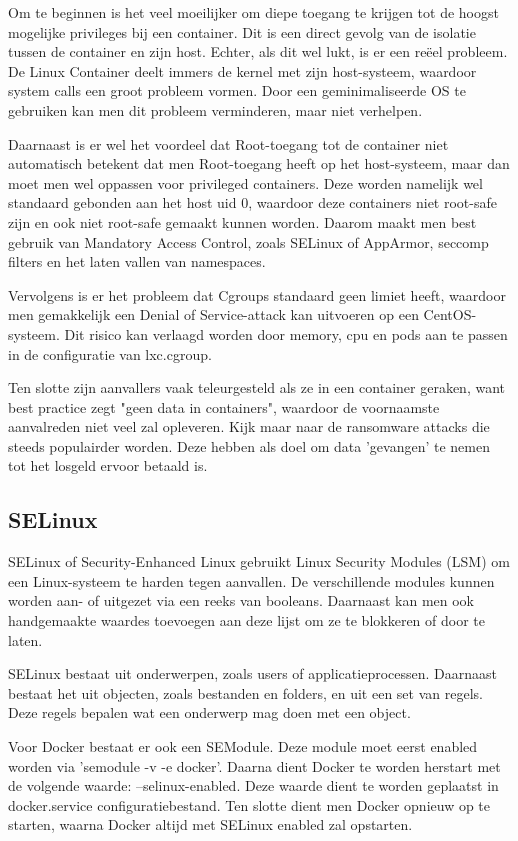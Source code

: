 Om te beginnen is het veel moeilijker om diepe toegang te krijgen tot de hoogst mogelijke privileges bij een container. Dit is een direct gevolg van de isolatie tussen de container en zijn host. Echter, als dit wel lukt, is er een reëel probleem. De Linux Container deelt immers de kernel met zijn host-systeem, waardoor system calls een groot probleem vormen. Door een geminimaliseerde OS te gebruiken kan men dit probleem verminderen, maar niet verhelpen.

Daarnaast is er wel het voordeel dat Root-toegang tot de container niet automatisch betekent dat men Root-toegang heeft op het host-systeem, maar dan moet men wel oppassen voor privileged containers. Deze worden namelijk wel standaard gebonden aan het host uid 0, waardoor deze containers niet root-safe zijn en ook niet root-safe gemaakt kunnen worden. Daarom maakt men best gebruik van Mandatory Access Control, zoals SELinux of AppArmor, seccomp filters en het laten vallen van namespaces.

Vervolgens is er het probleem dat Cgroups standaard geen limiet heeft, waardoor men gemakkelijk een Denial of Service-attack kan uitvoeren op een CentOS-systeem. Dit risico kan verlaagd worden door memory, cpu en pods aan te passen in de configuratie van lxc.cgroup.

Ten slotte zijn aanvallers vaak teleurgesteld als ze in een container geraken, want best practice zegt "geen data in containers", waardoor de voornaamste aanvalreden niet veel zal opleveren. Kijk maar naar de ransomware attacks die steeds populairder worden. Deze hebben als doel om data 'gevangen' te nemen tot het losgeld ervoor betaald is. \autocite{Weissig2013 } \autocite{Reno2016} \autocite{Wang2017}

\subsection{SELinux}
SELinux of Security-Enhanced Linux gebruikt Linux Security Modules (LSM) om een Linux-systeem te harden tegen aanvallen. De verschillende modules kunnen worden aan- of uitgezet via een reeks van booleans. Daarnaast kan men ook handgemaakte waardes toevoegen aan deze lijst om ze te blokkeren of door te laten.

SELinux bestaat uit onderwerpen, zoals users of applicatieprocessen. Daarnaast bestaat het uit objecten, zoals bestanden en folders, en uit een set van regels. Deze regels bepalen wat een onderwerp mag doen met een object.

Voor Docker bestaat er ook een SEModule. Deze module moet eerst enabled worden via 'semodule -v -e docker'. Daarna dient Docker te worden herstart met de volgende waarde: --selinux-enabled. Deze waarde dient te worden geplaatst in docker.service configuratiebestand. Ten slotte dient men Docker opnieuw op te starten, waarna Docker altijd met SELinux enabled zal opstarten.

